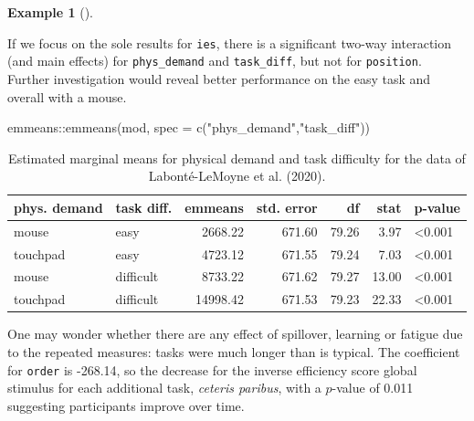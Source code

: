 \documentclass[
  11pt,
  letterpaper,
]{scrbook}
\newenvironment{Shaded}{\begin{snugshade}}{\end{snugshade}}
\newcommand{\AttributeTok}[1]{\textcolor[rgb]{0.40,0.45,0.13}{#1}}
\newcommand{\FunctionTok}[1]{\textcolor[rgb]{0.28,0.35,0.67}{#1}}
\newcommand{\NormalTok}[1]{\textcolor[rgb]{0.00,0.23,0.31}{#1}}
\newcommand{\SpecialCharTok}[1]{\textcolor[rgb]{0.37,0.37,0.37}{#1}}
\newcommand{\StringTok}[1]{\textcolor[rgb]{0.13,0.47,0.30}{#1}}
\theoremstyle{definition}
\newtheorem{example}{Example}[chapter]
\theoremstyle{definition}
\theoremstyle{remark}
\begin{document}
\begin{example}[]
\begin{longtable}[]
\end{longtable}

If we focus on the sole results for \texttt{ies}, there is a significant
two-way interaction (and main effects) for \texttt{phys\_demand} and
\texttt{task\_diff}, but not for \texttt{position}. Further
investigation would reveal better performance on the easy task and
overall with a mouse.

\begin{Shaded}
\begin{Highlighting}[]
\NormalTok{emmeans}\SpecialCharTok{::}\FunctionTok{emmeans}\NormalTok{(mod, }\AttributeTok{spec =} \FunctionTok{c}\NormalTok{(}\StringTok{"phys\_demand"}\NormalTok{,}\StringTok{"task\_diff"}\NormalTok{))}
\end{Highlighting}
\end{Shaded}

\begin{longtable}[]{@{}llrrrrl@{}}

\caption{\label{tbl-labonte-emmeans}Estimated marginal means for
physical demand and task difficulty for the data of Labonté-LeMoyne et
al. (2020).}

\tabularnewline

\toprule\noalign{}
phys. demand & task diff. & emmeans & std. error & df & stat &
p-value \\
\midrule\noalign{}
\endhead
\bottomrule\noalign{}
\endlastfoot
mouse & easy & 2668.22 & 671.60 & 79.26 & 3.97 & \textless0.001 \\
touchpad & easy & 4723.12 & 671.55 & 79.24 & 7.03 & \textless0.001 \\
mouse & difficult & 8733.22 & 671.62 & 79.27 & 13.00 & \textless0.001 \\
touchpad & difficult & 14998.42 & 671.53 & 79.23 & 22.33 &
\textless0.001 \\

\end{longtable}

One may wonder whether there are any effect of spillover, learning or
fatigue due to the repeated measures: tasks were much longer than is
typical. The coefficient for \texttt{order} is -268.14, so the decrease
for the inverse efficiency score global stimulus for each additional
task, \emph{ceteris paribus}, with a \(p\)-value of 0.011 suggesting
participants improve over time.

\begin{figure}[ht!]

\centering{

}
\end{figure}
\end{example}
\end{document}
